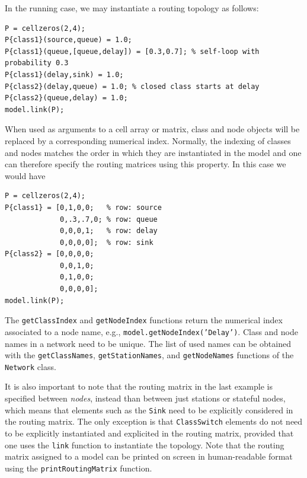 In the running case, we may instantiate a routing topology as follows:
\begin{lstlisting}
P = cellzeros(2,4);
P{class1}(source,queue) = 1.0;
P{class1}(queue,[queue,delay]) = [0.3,0.7]; % self-loop with probability 0.3
P{class1}(delay,sink) = 1.0;
P{class2}(delay,queue) = 1.0; % closed class starts at delay
P{class2}(queue,delay) = 1.0;
model.link(P);
\end{lstlisting}
When used as arguments to a cell array or matrix, class and node objects will be replaced by a corresponding numerical index.
Normally, the indexing of classes and nodes matches the order in which they are instantiated in the model and one can therefore specify the routing matrices using this property. In this case we would have
\begin{lstlisting}
P = cellzeros(2,4);
P{class1} = [0,1,0,0;   % row: source
             0,.3,.7,0; % row: queue
             0,0,0,1;   % row: delay
             0,0,0,0];  % row: sink
P{class2} = [0,0,0,0;
             0,0,1,0;
             0,1,0,0;
             0,0,0,0];
model.link(P);
\end{lstlisting}
The \texttt{getClassIndex} and \texttt{getNodeIndex} functions return the numerical index associated to a node name, e.g.,
\texttt{model.getNodeIndex('Delay')}. Class and node names in a network need to be unique. The list of used names can be obtained with the \texttt{getClassNames}, \texttt{getStationNames}, and \texttt{getNodeNames} functions of the \texttt{Network} class.

It is also important to note that the routing matrix in the last example is specified between {\em nodes}, instead than between just stations or stateful nodes, which means that elements such as the \texttt{Sink} need to be explicitly considered in the routing matrix. The only exception is that \texttt{ClassSwitch} elements do not need to be explicitly instantiated and explicited in the routing matrix, provided that one uses the \texttt{link} function to instantiate the topology. Note that the routing matrix assigned to a model can be printed on screen in human-readable format using the \texttt{printRoutingMatrix} function.

